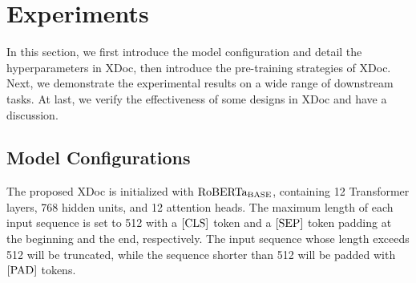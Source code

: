 \documentclass[11pt]{article}
\begin{document}
\section{Experiments}
In this section, we first introduce the model configuration and detail the hyperparameters in XDoc, then introduce the pre-training strategies of XDoc. Next, we demonstrate the experimental results on a wide range of downstream tasks. At last, we verify the effectiveness of some designs in XDoc and have a discussion.

\subsection{Model Configurations}
The proposed XDoc is initialized with ${\rm RoBERTa_{BASE}}$, containing 12 Transformer layers, 768 hidden units, and 12 attention heads. The maximum length of each input sequence is set to 512 with a ${\rm [CLS]}$ token and a ${\rm [SEP]}$ token padding at the beginning and the end, respectively. The input sequence whose length exceeds 512 will be truncated, while the sequence shorter than 512 will be padded with ${\rm [PAD]}$ tokens.
\end{document}
